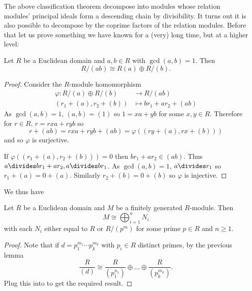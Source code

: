 \documentclass[a4paper]{article}
\theoremstyle{definition}
\begin{document}
The above classification theorem decompose into modules whose relation modules' principal ideals form a descending chain by divisibility. It turns out it is also possible to decompose by the coprime factors of the relation modules. Before that let us prove something we have known for a (very) long time, but at a higher level:

\begin{lemma}
  Let \(R\) be a Euclidean domain and \(a, b \in R\) with \(\gcd(a, b) = 1\). Then
  \[
    R/(ab) \cong R(a) \oplus R/(b).
  \]
\end{lemma}

\begin{proof}
  Consider the \(R\)-module homomorphism
  \begin{align*}
    \varphi: R/(a) \oplus R/(b) &\to R/(ab) \\
    (r_1 + (a), r_2 + (b)) &\mapsto br_1 + ar_2 + (ab)
  \end{align*}
  As \(\gcd(a, b) = 1\), \((a, b) = (1)\) so \(1 = xa + yb\) for some \(x, y \in R\). Therefore for \(r \in R\), \(r = rxa + ryb\) so
  \[
    r + (ab) = rxa + ryb + (ab) = \varphi((ry + (a), rx + (b)))
  \]
  and so \(\varphi\) is surjective.

  If \(\varphi((r_1 + (a), r_2 + (b))) = 0\) then \(br_1 + ar_2 \in (ab)\). Thus \(a \divides br_1 + ar_2, a \divides br_1\). As \(\gcd(a, b) = 1\), \(a \divides r_1\) so \(r_1 + (a) = 0 + (a)\). Similarly \(r_2 + (b) = 0 + (b)\) so \(\varphi\) is injective.
\end{proof}

We thus have

\begin{theorem}
  \label{thm:primary decomposition}
  Let \(R\) be a Euclidean domain and \(M\) be a finitely generated \(R\)-module. Then
  \[
    M \cong \bigoplus_{i = 1}^n N_i
  \]
  with each \(N_i\) either equal to \(R\) or \(R/(p^m)\) for some prime \(p \in R\) and \(n \geq 1\).
\end{theorem}

\begin{proof}
  Note that if \(d = p_1^{m_1} \cdots p_k^{m_k}\) with \(p_i \in R\) distinct primes, by the previous lemma
  \[
    \frac{R}{(d)} \cong \frac{R}{(p_1^{n_1})} \oplus \dots \oplus \frac{R}{(p_k^{m_k})}.
  \]
  Plug this into  to get the required result.
\end{proof}
\end{document}
